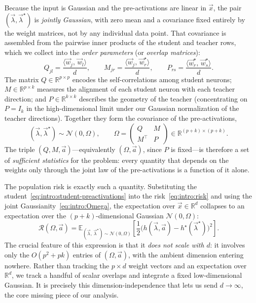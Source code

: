 Because the input is Gaussian and the pre-activations are linear in $\vec{x}$, the
pair $(\vec{\lambda}, \vec{\lambda}^\star)$ is \emph{jointly Gaussian}, with zero mean
and a covariance fixed entirely by the weight matrices, not by any individual data
point.
That covariance is assembled from the pairwise inner products of the student and
teacher rows, which we collect into the \emph{order parameters} (or \emph{overlap
matrices}):
\begin{equation}
\label{eq:intro:overlaps}
    Q_{jl} = \frac{\langle \vec{w}_j,\, \vec{w}_l\rangle}{d}, \qquad
    M_{jr} = \frac{\langle \vec{w}_j,\, \vec{w}^\star_r\rangle}{d}, \qquad
    P_{rs} = \frac{\langle \vec{w}^\star_r,\, \vec{w}^\star_s\rangle}{d}.
\end{equation}
The matrix $Q \in \mathbb{R}^{p \times p}$ encodes the self-correlations among
student neurons; $M \in \mathbb{R}^{p \times k}$ measures the alignment of each
student neuron with each teacher direction; and $P \in \mathbb{R}^{k \times k}$
describes the geometry of the teacher (concentrating on $P = I_k$ in the
high-dimensional limit under our Gaussian normalization of the teacher directions).
Together they form the covariance of the pre-activations,
\begin{equation}
\label{eq:intro:Omega}
    (\vec{\lambda}, \vec{\lambda}^\star) \sim \mathcal{N}(0, \Omega), \qquad
    \Omega = \begin{pmatrix} Q & M \\ M^\top & P \end{pmatrix}
    \in \mathbb{R}^{(p+k) \times (p+k)}.
\end{equation}
The triple $(Q, M, \vec{a})$---equivalently $(\Omega, \vec{a})$, since $P$ is
fixed---is therefore a set of \emph{sufficient statistics} for the problem: every
quantity that depends on the weights only through the joint law of the
pre-activations is a function of it alone.

The population risk is exactly such a quantity.
Substituting the student~\eqref{eq:intro:student-preactivations} into the
risk~\eqref{eq:intro:risk} and using the joint Gaussianity~\eqref{eq:intro:Omega},
the expectation over $\vec{x} \in \mathbb{R}^d$ collapses to an expectation over the
$(p+k)$-dimensional Gaussian $\mathcal{N}(0, \Omega)$:
\begin{equation}
\label{eq:intro:risk-preactivations}
    \mathcal{R}(\Omega, \vec{a})
    = \mathbb{E}_{(\vec{\lambda},\, \vec{\lambda}^\star) \sim \mathcal{N}(0, \Omega)}
        \!\left[\frac{1}{2}
        \bigl(h(\vec{\lambda}, \vec{a}) - h^\star(\vec{\lambda}^\star)\bigr)^2\right].
\end{equation}
The crucial feature of this expression is that it \emph{does not scale with $d$}: it
involves only the $O(p^2 + pk)$ entries of $(\Omega, \vec{a})$, with the ambient
dimension entering nowhere.
Rather than tracking the $p \times d$ weight vectors and an expectation over
$\mathbb{R}^d$, we track a handful of scalar overlaps and integrate a fixed
low-dimensional Gaussian.
It is precisely this dimension-independence that lets us send $d \to \infty$, the
core missing piece of our analysis.
